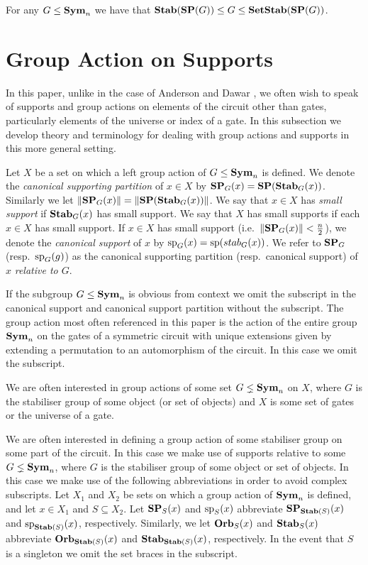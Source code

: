 \documentclass[../main/thesis.tex]{subfiles}
\begin{document}
\begin{lem}
  For any $G \leq \text{\textbf{Sym}}_n$ we have that $\text{\textbf{Stab}} (\text{\textbf{SP}} (G)) \leq G \leq
  \text{\textbf{SetStab}}(\text{\textbf{SP}}(G))$.
\end{lem}

\section{Group Action on Supports}
\label{subsec:group-actions-on-supports}
In this paper, unlike in the case of Anderson and Dawar \cite{AndersonD17}, we
often wish to speak of supports and group actions on elements of the circuit
other than gates, particularly elements of the universe or index of a gate. In
this subsection we develop theory and terminology for dealing with group actions
and supports in this more general setting.

\begin{definition}
  Let $X$ be a set on which a left group action of $G \leq \text{\textbf{Sym}}_n$ is defined.
  We denote the \emph{canonical supporting partition} of $x \in X$ by $\text{\textbf{SP}}_G (x)
  = \text{\textbf{SP}} (\text{\textbf{Stab}}_G(x))$. Similarly we let $\| \text{\textbf{SP}}_G (x) \| = \| \text{\textbf{SP}} (\text{\textbf{Stab}}_G(x))
  \|$. We say that $x \in X$ has \emph{small support} if $\text{\textbf{Stab}}_G(x)$ has small
  support. We say that $X$ has small supports if each $x \in X$ has small
  support. If $x \in X$ has small support (i.e.\ $\| \text{\textbf{SP}}_G(x) \| <
  \frac{n}{2}$), we denote the \emph{canonical support} of $x$ by $\text{sp}_G(x) =
  \text{sp} (stab_G(x))$. We refer to $\text{\textbf{SP}}_G$ (resp.\ $\text{sp}_G(g)$) as the
  canonical supporting partition (resp.\ canonical support) of $x$
  \emph{relative to $G$}.
\end{definition}

If the subgroup $G \leq \text{\textbf{Sym}}_n$ is obvious from context we omit the subscript in
the canonical support and canonical support partition without the subscript. The
group action most often referenced in this paper is the action of the entire
group $\text{\textbf{Sym}}_n$ on the gates of a symmetric circuit with unique extensions given
by extending a permutation to an automorphism of the circuit. In this case we
omit the subscript.

We are often interested in group actions of some set $G \lneq \text{\textbf{Sym}}_n$ on $X$,
where $G$ is the stabiliser group of some object (or set of objects) and $X$ is
some set of gates or the universe of a gate.

We are often interested in defining a group action of some stabiliser group on
some part of the circuit. In this case we make use of supports relative to some
$G \lneq \text{\textbf{Sym}}_n$, where $G$ is the stabiliser group of some object or set of
objects. In this case we make use of the following abbreviations in order to
avoid complex subscripts. Let $X_1$ and $X_2$ be sets on which a group action of
$\text{\textbf{Sym}}_n$ is defined, and let $x \in X_1$ and $S \subseteq X_2$. Let $\text{\textbf{SP}}_S(x)$
and $\text{sp}_S(x)$ abbreviate $\text{\textbf{SP}}_{\text{\textbf{Stab}}(S)}(x)$ and $\text{sp}_{\text{\textbf{Stab}}(S)}(x)$,
respectively. Similarly, we let $\text{\textbf{Orb}}_S(x)$ and $\text{\textbf{Stab}}_S(x)$ abbreviate
$\text{\textbf{Orb}}_{\text{\textbf{Stab}}(S)}(x)$ and $\text{\textbf{Stab}}_{\text{\textbf{Stab}}(S)}(x)$, respectively. In the event that
$S$ is a singleton we omit the set braces in the subscript.
\end{document}
